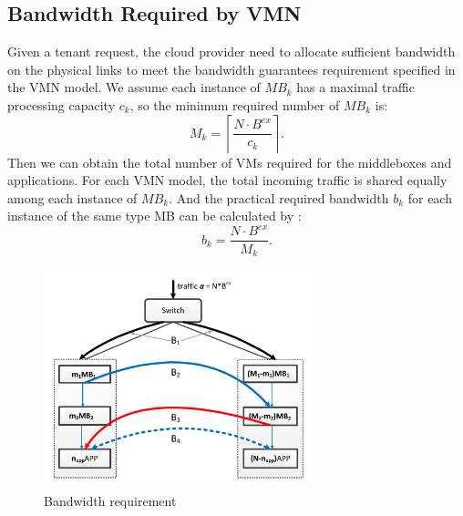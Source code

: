 \documentclass[review]{elsarticle}
\begin{document}
\subsection{Bandwidth Required by VMN}
Given a tenant request, the cloud provider need to allocate sufficient bandwidth on the physical links to meet the bandwidth guarantees requirement specified in the VMN model.
We assume each instance of $MB_k$ has
a maximal traffic processing capacity $c_k$, so the minimum
required number of $MB_k$ is:
\begin{equation}
 M_{k}={\left\lceil\frac{N \cdot B^{ex}}{c_{k}}\right\rceil}. 
\end{equation}
Then we can obtain the total number of VMs required for the middleboxes and applications.
For each VMN model, %
the total incoming traffic is shared equally among each instance of $MB_k$. And the practical required bandwidth $b_k$ for each instance of the same type MB can be calculated by :
\begin{equation}
\label{equ:bk}
b_{k}=\frac{N\cdot B^{ex}}{M_{k}}.
\end{equation}


\begin{figure}
	\centering
	     \includegraphics[width=3.2 in, height=2.5in]{fig/bandwidth_requirement3.pdf}
	\caption{Bandwidth requirement}
	\label{fig:bw}
\end{figure}
\end{document}
